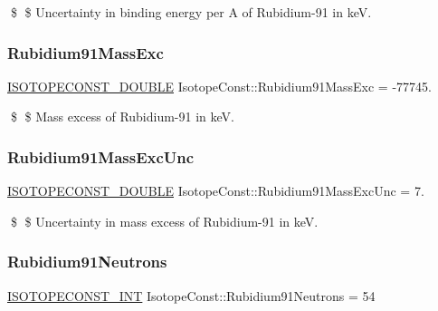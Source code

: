 \$ \$ Uncertainty in binding energy per A of Rubidium-\/91 in keV. \mbox{\label{group___isotope_const-_rubidium-_rb91_gaa81b3fd918aceec45284852d91ad6e0a}} 
\subsubsection{\texorpdfstring{Rubidium91\+Mass\+Exc}{Rubidium91MassExc}}
{\footnotesize\ttfamily \mbox{\hyperlink{group___isotope_const-_macros_ga8f45a7272ce02c0b4c65c44636ed719a}{I\+S\+O\+T\+O\+P\+E\+C\+O\+N\+S\+T\+\_\+\+D\+O\+U\+B\+LE}} Isotope\+Const\+::\+Rubidium91\+Mass\+Exc = -\/77745.}

\$ \$ Mass excess of Rubidium-\/91 in keV. \mbox{\label{group___isotope_const-_rubidium-_rb91_gaf2768a09e379a17234fcacbb28db1eca}} 
\subsubsection{\texorpdfstring{Rubidium91\+Mass\+Exc\+Unc}{Rubidium91MassExcUnc}}
{\footnotesize\ttfamily \mbox{\hyperlink{group___isotope_const-_macros_ga8f45a7272ce02c0b4c65c44636ed719a}{I\+S\+O\+T\+O\+P\+E\+C\+O\+N\+S\+T\+\_\+\+D\+O\+U\+B\+LE}} Isotope\+Const\+::\+Rubidium91\+Mass\+Exc\+Unc = 7.}

\$ \$ Uncertainty in mass excess of Rubidium-\/91 in keV. \mbox{\label{group___isotope_const-_rubidium-_rb91_gae29f8873007d857d8d2f75eeaea35c7a}} 
\subsubsection{\texorpdfstring{Rubidium91\+Neutrons}{Rubidium91Neutrons}}
{\footnotesize\ttfamily \mbox{\hyperlink{group___isotope_const-_macros_ga5f18360b3e99483a35c32d789e62621c}{I\+S\+O\+T\+O\+P\+E\+C\+O\+N\+S\+T\+\_\+\+I\+NT}} Isotope\+Const\+::\+Rubidium91\+Neutrons = 54}

